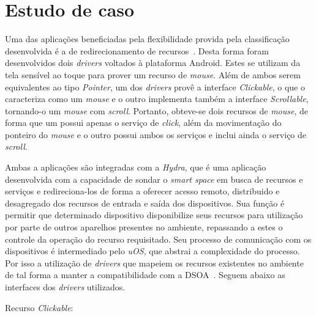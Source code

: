 \section{Estudo de caso}
\label{sec:estudoDeCaso}

Uma das aplicações beneficiadas pela flexibilidade provida pela classificação desenvolvida é a de redirecionamento de recursos~\cite{lucas2011}. Desta forma foram desenvolvidos dois \emph{drivers} voltados à plataforma Android. Estes se utilizam da tela sensível ao toque para prover um recurso de \emph{mouse}. Além de ambos serem equivalentes ao tipo \emph{Pointer}, um dos \emph{drivers} provê a interface \emph{Clickable}, o que o caracteriza como um \emph{mouse} e o outro implementa também a interface \emph{Scrollable}, tornando-o um \emph{mouse} com \emph{scroll}. Portanto, obteve-se dois recursos de \emph{mouse}, de forma que um possui apenas o serviço de \emph{click}, além da movimentação do ponteiro do \emph{mouse} e o outro possui ambos os serviços e inclui ainda o serviço de \emph{scroll}.

Ambas a aplicações são integradas com a \emph{Hydra}, que é uma aplicação desenvolvida com a capacidade de sondar o \emph{smart space} em busca de recursos e serviços e redireciona-los de forma a oferecer acesso remoto, distribuido e desagregado dos recursos de entrada e saída dos dispositivos. Sua função é permitir que determinado dispositivo disponibilize seus recursos para utilização por parte de outros aparelhos presentes no ambiente, repassando a estes o controle da operação do recurso requisitado. Seu processo de comunicação com os dispositivos é intermediado pelo \emph{uOS}, que abstrai a complexidade do processo. Por isso a utilização de \emph{drivers} que mapeiem os recursos existentes no ambiente de tal forma a manter a compatibilidade com a DSOA~\cite{lucas2011}. Seguem abaixo as interfaces dos \emph{drivers} utilizados.

Recurso \emph{Clickable}:

